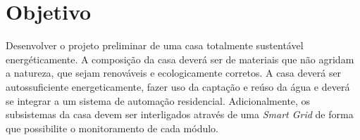 \section{Objetivo}

	Desenvolver o projeto preliminar de uma casa totalmente sustentável energéticamente. A composição da casa deverá ser de materiais que não agridam a natureza, que sejam renováveis e ecologicamente corretos. A casa deverá ser autossuficiente energeticamente, fazer uso da captação e reúso da água e deverá se integrar a um sistema de automação residencial. Adicionalmente, os subsistemas da casa devem ser interligados através de uma \textit{Smart Grid} de forma que possibilite o monitoramento de cada módulo.
